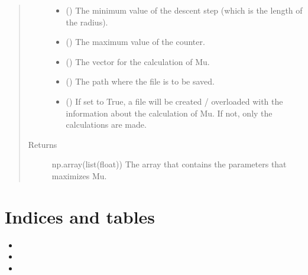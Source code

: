 \documentclass[letterpaper,10pt,english]{sphinxmanual}
\begin{document}
\begin{fulllineitems}
\begin{quote}
\begin{description}
\begin{itemize}
\item {} 
 () \textendash{} The minimum value of the descent step (which is 
the length of the radius).

\item {} 
 () \textendash{} The maximum value of the counter.

\item {} 
 (\sphinxstyleliteralemphasis{\sphinxupquote{(}}\sphinxstyleliteralemphasis{\sphinxupquote{)}}) \textendash{} The vector for the calculation of Mu.

\item {} 
 () \textendash{} The path where the file is to be saved.

\item {} 
 () \textendash{} If set to True, a file will be created / 
overloaded with the information about the calculation of Mu. If not, 
only the calculations are made.

\end{itemize}

\item[{Returns}] \leavevmode
np.array(list(float)) \textendash{} The array that contains the parameters 
that maximizes Mu.

\end{description}\end{quote}

\end{fulllineitems}



\chapter{Indices and tables}
\label{\detokenize{index:indices-and-tables}}\begin{itemize}
\item {} 

\item {} 

\item {} 

\end{itemize}
\end{document}
